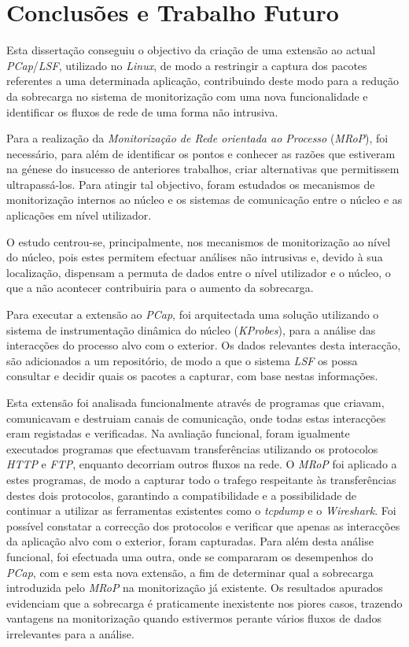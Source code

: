 \chapter{Conclusões e Trabalho Futuro}
\label{cap:conclusao}

Esta dissertação conseguiu o objectivo da criação de uma extensão ao actual \textit{PCap}/\textit{LSF}, utilizado no \textit{Linux}, de modo a restringir a captura dos pacotes referentes a uma determinada aplicação, contribuindo deste modo para a redução da sobrecarga no sistema de monitorização com uma nova funcionalidade e identificar os fluxos de rede de uma forma não intrusiva.

Para a realização da \textit{Monitorização de Rede orientada ao Processo} (\textit{MRoP}), foi necessário, para além de identificar os pontos e conhecer as razões que estiveram na génese do insucesso de anteriores trabalhos, criar alternativas que permitissem ultrapassá-los.
Para atingir tal objectivo, foram estudados os mecanismos de monitorização internos ao núcleo e os sistemas de comunicação entre o núcleo e as aplicações em nível utilizador.

O estudo centrou-se, principalmente, nos mecanismos de monitorização ao nível do núcleo, pois estes permitem efectuar análises não intrusivas e, devido à sua localização, dispensam a permuta de dados entre o nível utilizador e o núcleo, o que a não acontecer contribuiria para o aumento da sobrecarga.

Para executar a extensão ao \textit{PCap}, foi arquitectada uma solução utilizando o sistema de instrumentação dinâmica do núcleo (\textit{KProbes}), para a análise das interacções do processo alvo com o exterior.
Os dados relevantes desta interacção, são adicionados a um repositório, de modo a que o sistema \textit{LSF} os possa consultar e decidir quais os pacotes a capturar, com base nestas informações.

Esta extensão foi analisada funcionalmente através de programas que criavam, comunicavam e destruiam canais de comunicação, onde todas estas interacções eram registadas e verificadas.
Na avaliação funcional, foram igualmente executados programas que efectuavam transferências utilizando os protocolos \textit{HTTP} e \textit{FTP}, enquanto decorriam outros fluxos na rede. 
O \textit{MRoP} foi aplicado a estes programas, de modo a capturar todo o trafego respeitante às transferências destes dois protocolos, garantindo a compatibilidade e a possibilidade de continuar a utilizar as ferramentas existentes como o \textit{tcpdump} e o \textit{Wireshark}.
Foi possível constatar a correcção dos protocolos e verificar que apenas as interacções da aplicação alvo com o exterior, foram capturadas.
Para além desta análise funcional, foi efectuada uma outra, onde se compararam os desempenhos do \textit{PCap}, com e sem esta nova extensão, a fim de determinar qual a sobrecarga introduzida pelo \textit{MRoP} na monitorização já existente.
Os resultados apurados evidenciam que a sobrecarga é praticamente inexistente nos piores casos, trazendo vantagens na monitorização quando estivermos perante vários fluxos de dados irrelevantes para a análise.

